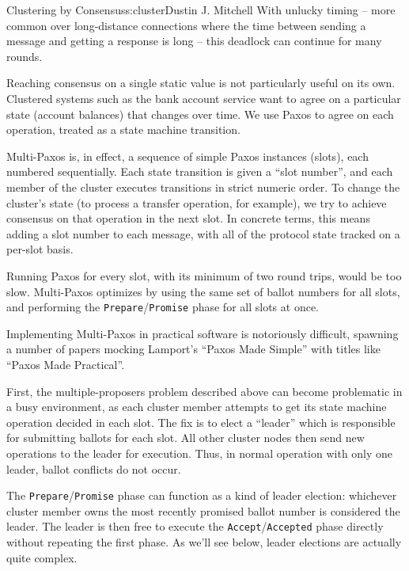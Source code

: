 \begin{aosachapter}{Clustering by Consensus}{s:cluster}{Dustin J. Mitchell}
With unlucky timing -- more common over long-distance connections where
the time between sending a message and getting a response is long --
this deadlock can continue for many rounds.

\label{multi-paxos}

Reaching consensus on a single static value is not particularly useful
on its own. Clustered systems such as the bank account service want to
agree on a particular state (account balances) that changes over time.
We use Paxos to agree on each operation, treated as a state machine
transition.

Multi-Paxos is, in effect, a sequence of simple Paxos instances (slots),
each numbered sequentially. Each state transition is given a ``slot
number'', and each member of the cluster executes transitions in strict
numeric order. To change the cluster's state (to process a transfer
operation, for example), we try to achieve consensus on that operation
in the next slot. In concrete terms, this means adding a slot number to
each message, with all of the protocol state tracked on a per-slot
basis.

Running Paxos for every slot, with its minimum of two round trips, would
be too slow. Multi-Paxos optimizes by using the same set of ballot
numbers for all slots, and performing the
\texttt{Prepare}/\texttt{Promise} phase for all slots at once.

\label{paxos-made-pretty-hard}

Implementing Multi-Paxos in practical software is notoriously difficult,
spawning a number of papers mocking Lamport's ``Paxos Made Simple'' with
titles like ``Paxos Made Practical''.

First, the multiple-proposers problem described above can become
problematic in a busy environment, as each cluster member attempts to
get its state machine operation decided in each slot. The fix is to
elect a ``leader'' which is responsible for submitting ballots for each
slot. All other cluster nodes then send new operations to the leader for
execution. Thus, in normal operation with only one leader, ballot
conflicts do not occur.

The \texttt{Prepare}/\texttt{Promise} phase can function as a kind of
leader election: whichever cluster member owns the most recently
promised ballot number is considered the leader. The leader is then free
to execute the \texttt{Accept}/\texttt{Accepted} phase directly without
repeating the first phase. As we'll see below, leader elections are
actually quite complex.


\end{aosachapter}
